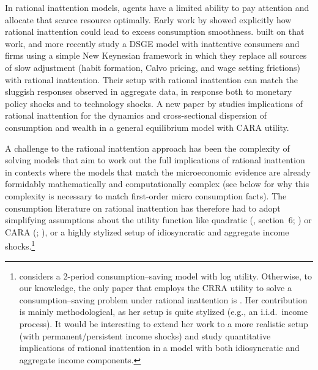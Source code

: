 \documentclass[titlepage]{./econtex}
\begin{document}
In rational inattention models, agents have a limited ability to pay attention and allocate that scarce resource optimally. Early work by \cite{reis:inattentive} showed explicitly how rational inattention could lead to excess consumption smoothness.
\cite{mw09:RI} built on that work, and more recently \cite{mackWiedREStud15} study a DSGE model with inattentive consumers and firms using a simple New Keynesian framework in which they replace all sources of slow adjustment (habit formation, Calvo pricing, and wage setting frictions) with rational inattention.  Their setup with rational inattention can match the sluggish responses observed in aggregate data, in response both to monetary policy shocks and to technology shocks. A new paper by \cite{LuoRinGE} studies implications of rational inattention for the dynamics and cross-sectional dispersion of consumption and wealth in a general equilibrium model with CARA utility.

A challenge to the rational inattention approach has been the complexity of solving models that aim to work out the full implications of rational inattention in contexts where the models that match the microeconomic evidence are already formidably mathematically and computationally complex (see below for why this complexity is necessary to match first-order micro consumption facts).  The consumption literature on rational inattention has therefore had to adopt simplifying assumptions about the utility function like quadratic (\cite{simsInattention}, section~6; \cite{luo:inatC}) or CARA (\cite{LuoRinGE}; \cite{reis:inattentive}), or a highly stylized setup of idiosyncratic and aggregate income shocks.\footnote{\cite{sims_beyondLQ} considers a 2-period consumption--saving model with log utility. Otherwise, to our knowledge, the only paper that employs the CRRA utility to solve a consumption--saving problem under rational inattention is \cite{tutino_RIconsumption}. Her contribution is mainly methodological, as her setup is quite stylized (e.g., an i.i.d.\ income process).  It would be interesting to extend her work to a more realistic setup (with permanent/persistent income shocks) and study quantitative implications of rational inattention in a model with both idiosyncratic and aggregate income components.}
\end{document}
